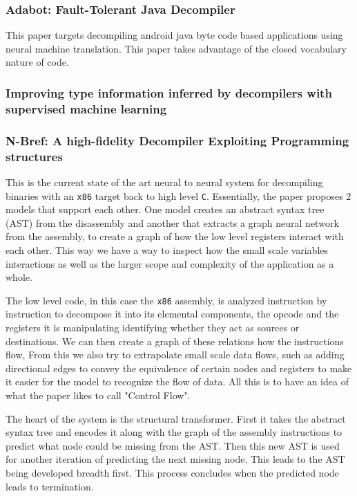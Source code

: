 \documentclass[conference,a4paper]{IEEEtran}
\begin{document}
\subsubsection{Adabot: Fault-Tolerant Java Decompiler}

This paper targets decompiling android java byte code based applications using neural machine translation.
This paper takes advantage of the closed vocabulary nature of code.

\subsubsection{Improving type information inferred by decompilers
with supervised machine learning}

\subsubsection{N-Bref: A high-fidelity Decompiler Exploiting Programming structures}

This is the current state of the art neural to neural system for decompiling binaries with an \verb|x86| target back to high level \verb|C|.
Essentially, the paper proposes 2 models that support each other.
One model creates an abstract syntax tree (AST) from the disassembly and another that extracts a graph neural network from the assembly, to create a graph of how the low level registers interact with each other.
This way we have a way to inspect how the small scale variables interactions as well as the larger scope and complexity of the application as a whole.

The low level code, in this case the \verb|x86| assembly, is analyzed instruction by instruction to decompose it into its elemental components, the opcode and the registers it is manipulating identifying whether they act as sources or destinations.
We can then create a graph of these relations how the instructions flow,
From this we also try to extrapolate small scale data flows, such as adding directional edges to convey the equivalence of certain nodes and registers to make it easier for the model to recognize the flow of data.
All this is to have an idea of what the paper likes to call "Control Flow".

The heart of the system is the structural transformer.
First it takes the abstract syntax tree and encodes it along with the graph of the assembly instructions to predict what node could be missing from the AST.
Then this new AST is used for another iteration of predicting the next missing node.
This leads to the AST being developed breadth first.
This process concludes when the predicted node leads to termination.
\end{document}
